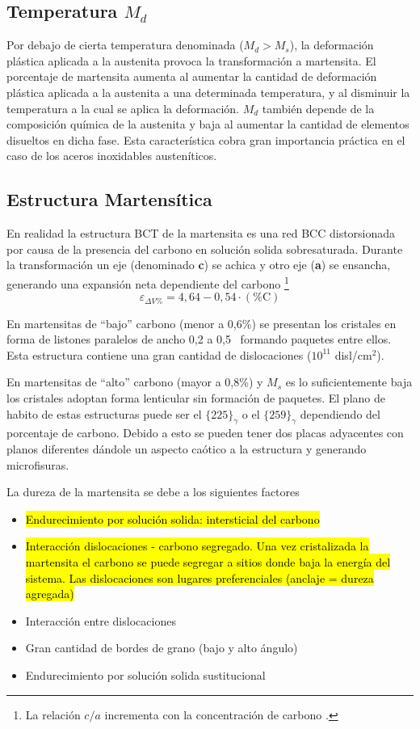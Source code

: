 \subsection[Temperatura {\it Md}]{Temperatura $M_d$}
Por debajo de cierta temperatura denominada ($M_d> M_s$), la
deformación plástica aplicada a la austenita provoca la transformación a martensita. El porcentaje de martensita aumenta al aumentar la cantidad de deformación plástica aplicada a la austenita a una determinada temperatura, y al disminuir la temperatura a la cual se aplica la deformación. $M_d$ también depende de la composición química de la austenita y baja al aumentar la cantidad de elementos disueltos en dicha fase. Esta característica cobra gran importancia práctica en el caso de los aceros inoxidables austeníticos. 

\subsection{Estructura Martensítica}
En realidad la estructura BCT de la martensita es una red BCC distorsionada por causa de la presencia del carbono en solución solida sobresaturada. Durante la transformación un eje (denominado \textbf{c}) se achica y otro eje (\textbf{a}) se ensancha, generando una expansión neta dependiente del carbono \footnote{La relación $c/a$ incrementa con la concentración de carbono \cite{gottstein2013physical}.}
\[
\varepsilon_{\Delta V \%} = 4,64-0,54\cdot (\% \mathrm{C})
\]



En martensitas de ``bajo'' carbono (menor a 0,6\%) se presentan los cristales en forma de listones paralelos de ancho 0,2 a 0,5\um~  formando paquetes entre ellos. Esta estructura contiene una gran cantidad de dislocaciones ($10^{11}$ disl/cm$^2$).

En martensitas de ``alto'' carbono (mayor a 0,8\%) y $M_s$ es lo suficientemente baja los cristales adoptan forma lenticular sin formación de paquetes. El plano de habito de estas estructuras puede ser el $\{225 \}_\gamma$ o el $\{259 \}_\gamma$ dependiendo del porcentaje de carbono. Debido a esto se pueden tener dos placas adyacentes con planos diferentes dándole un aspecto caótico a la estructura y generando microfisuras.

La dureza de la martensita se debe a los siguientes factores
\begin{itemize}
    \item \hl{Endurecimiento por solución solida: intersticial del carbono}
    \item \hl{Interacción dislocaciones - carbono segregado. Una vez cristalizada la martensita el carbono se puede segregar a sitios donde baja la energía del sistema. Las dislocaciones son lugares preferenciales (anclaje = dureza agregada)}
    \item Interacción entre dislocaciones
    \item Gran cantidad de bordes de grano (bajo y alto ángulo)
    \item Endurecimiento por solución solida sustitucional
\end{itemize}

